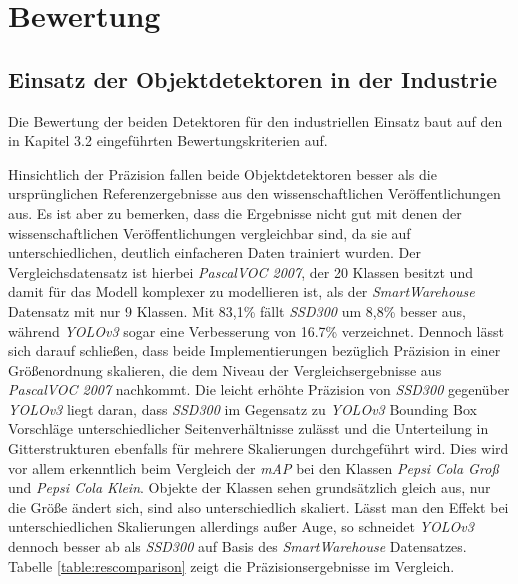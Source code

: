 \chapter{Bewertung}

\section{Einsatz der Objektdetektoren in der Industrie}

Die Bewertung der beiden Detektoren für den industriellen Einsatz baut auf den in Kapitel 3.2 eingeführten Bewertungskriterien auf. 

Hinsichtlich der Präzision fallen beide Objektdetektoren besser als die ursprünglichen Referenzergebnisse aus den wissenschaftlichen Veröffentlichungen aus. Es ist aber zu bemerken, dass die Ergebnisse nicht gut mit denen der wissenschaftlichen Veröffentlichungen vergleichbar sind, da sie auf unterschiedlichen, deutlich einfacheren Daten trainiert wurden. Der Vergleichsdatensatz ist hierbei \textit{PascalVOC 2007}, der 20 Klassen besitzt und damit für das Modell komplexer zu modellieren ist, als der \textit{SmartWarehouse} Datensatz mit nur 9 Klassen. Mit 83,1\% fällt \textit{SSD300} um 8,8\% besser aus, während \textit{YOLOv3} sogar eine Verbesserung von 16.7\% verzeichnet. Dennoch lässt sich darauf schließen, dass beide Implementierungen bezüglich Präzision in einer Größenordnung skalieren, die dem Niveau der Vergleichsergebnisse aus \textit{PascalVOC 2007} nachkommt. Die leicht erhöhte Präzision von \textit{SSD300} gegenüber \textit{YOLOv3} liegt daran, dass \textit{SSD300} im Gegensatz zu \textit{YOLOv3} Bounding Box Vorschläge unterschiedlicher Seitenverhältnisse zulässt und die Unterteilung in Gitterstrukturen ebenfalls für mehrere Skalierungen durchgeführt wird. Dies wird vor allem erkenntlich beim Vergleich der \textit{mAP} bei den Klassen \textit{Pepsi Cola Groß} und \textit{Pepsi Cola Klein}. Objekte der Klassen sehen grundsätzlich gleich aus, nur die Größe ändert sich, sind also unterschiedlich skaliert. Lässt man den Effekt bei unterschiedlichen Skalierungen allerdings außer Auge, so schneidet \textit{YOLOv3} dennoch besser ab als \textit{SSD300} auf Basis des \textit{SmartWarehouse} Datensatzes. Tabelle \ref{table:rescomparison} zeigt die Präzisionsergebnisse im Vergleich.

